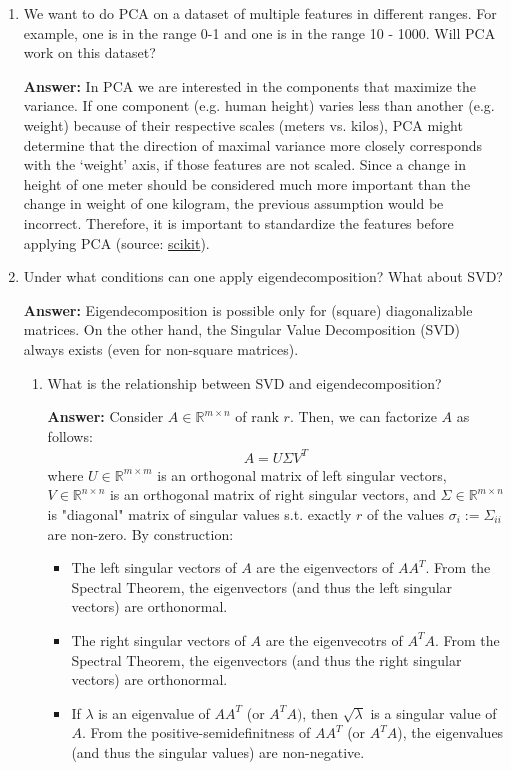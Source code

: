 \documentclass{article}
\newenvironment{QandA}{\begin{enumerate}[label=\arabic*.]}{\end{enumerate}}
\newenvironment{InnerQandA}{\begin{enumerate}[label=\roman*.]}{\end{enumerate}}
\newenvironment{answer}{\par\normalfont \textbf{Answer:}}{}
\newcommand{\R}{\mathbb{R}}
\begin{document}
\begin{QandA}
    \item We want to do PCA on a dataset of multiple features in different ranges. For example, one is in the range 0-1 and one is in the range 10 - 1000. Will PCA work on this dataset?
    \begin{answer}
         In PCA we are interested in the components that maximize the variance. If one component (e.g. human height) varies less than another (e.g. weight) because of their respective scales (meters vs. kilos), PCA might determine that the direction of maximal variance more closely corresponds with the ‘weight’ axis, if those features are not scaled. Since a change in height of one meter should be considered much more important than the change in weight of one kilogram, the previous assumption would be incorrect. Therefore, it is important to standardize the features before applying PCA (source: \href{https://scikit-learn.org/stable/auto_examples/preprocessing/plot_scaling_importance.html}{scikit}).
    \end{answer}

    \item Under what conditions can one apply eigendecomposition? What about SVD?
    \begin{answer}
        Eigendecomposition is possible only for (square) diagonalizable matrices. On the other hand, the Singular Value Decomposition (SVD) always exists (even for non-square matrices).
    \end{answer}
    \begin{InnerQandA}
        \item What is the relationship between SVD and eigendecomposition?
        \begin{answer}
            Consider $A \in \R^{m \times n}$ of rank $r$. Then, we can factorize $A$ as follows:
            \begin{align*}
                A = U \Sigma V^T
            \end{align*}
            where $U \in \R^{m \times m}$ is an orthogonal matrix of left singular vectors, $V \in \R^{n \times n}$ is an orthogonal matrix of right singular vectors, and $\Sigma \in \R^{m \times n}$ is "diagonal" matrix of singular values s.t. exactly $r$ of the values $\sigma_i := \Sigma_{ii}$ are non-zero. By construction:
            \begin{itemize}
                \item The left singular vectors of $A$ are the eigenvectors of $AA^T$. From the Spectral Theorem, the eigenvectors (and thus the left singular vectors) are orthonormal.
                \item The right singular vectors of $A$ are the eigenvecotrs of $A^TA$. From the Spectral Theorem, the eigenvectors (and thus the right singular vectors) are orthonormal.
                \item If $\lambda$ is an eigenvalue of $AA^T$ (or $A^TA)$, then $\sqrt{\lambda}$ is a singular value of $A$. From the positive-semidefinitness of $AA^T$ (or $A^TA$), the eigenvalues (and thus the singular values) are non-negative.
            \end{itemize}
        \end{answer}


\end{InnerQandA}
\end{QandA}
\end{document}
